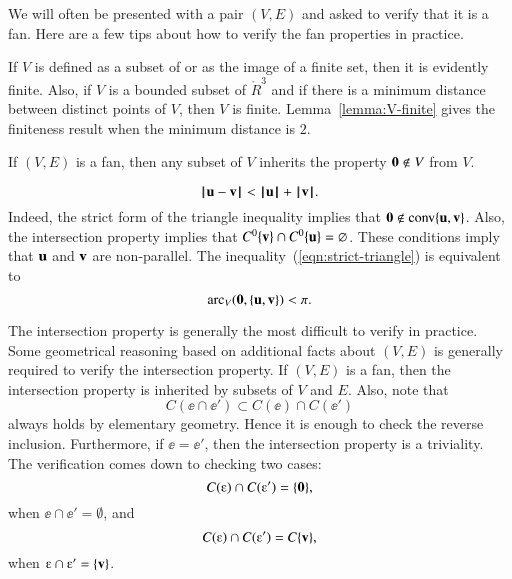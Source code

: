 \begin{remark}\label{remark:fan-verify}  
We will often be presented with a pair $(V,E)$ and asked to verify
that it is a fan.  Here are a few tips about how to verify the fan
properties in practice.
\begin{nomerate} 
\item {} If $V$ is defined as a subset of or as the image of a
finite set, then it is evidently finite.  Also, if $V$ is a bounded
subset of $\ring{R}^3$ and if there is a minimum distance between
distinct points of $V$, then $V$ is finite.
Lemma~\ref{lemma:V-finite} gives the finiteness result when the
minimum distance is $2$.\vspace{6pt}
\item {} If $(V,E)$ is a fan, then any subset of $V$
inherits the property ${\mathbf 0}\not\in V$ from $V$.  \vspace{6pt}
\item {} 
\begin{equation}\label{eqn:strict-triangle}
{\hskip0.1em|\hskip-0.15em|\hskip0.1em}{\mathbf u} - {\mathbf v}{\hskip0.1em|\hskip-0.15em|\hskip0.1em} < {{\hskip0.1em|\hskip-0.15em|\hskip0.1em}{\mathbf u}{\hskip0.1em|\hskip-0.15em|\hskip0.1em}} + {{\hskip0.1em|\hskip-0.15em|\hskip0.1em}{\mathbf v}{\hskip0.1em|\hskip-0.15em|\hskip0.1em}}.
\end{equation}
Indeed, the strict form of the triangle inequality implies that
${\mathbf 0}\not\in {\operatorname{conv}}\{{\mathbf u},{\mathbf v}\}$.  Also, the intersection property
implies that $C^0\{{\mathbf v}\} \cap C^0\{{\mathbf u}\} = \varnothing$.  These conditions
imply that ${\mathbf u}$ and ${\mathbf v}$ are non-parallel.  The inequality~(\ref{eqn:strict-triangle})
is equivalent to
\begin{displaymath}
\operatorname{arc}_V({\mathbf 0},\{{\mathbf u},{\mathbf v}\}) < \pi.
\end{displaymath}
\item {} The intersection property is generally the
most difficult to verify in practice.  Some geometrical reasoning
based on additional facts about $(V,E)$ is generally required to
verify the intersection property.  If $(V,E)$ is a fan, then the
intersection property is inherited by subsets of $V$ and $E$.  Also,
note that
\begin{displaymath}
C(\ee\cap \ee') \subset C(\ee) \cap C(\ee')
\end{displaymath}
always holds by elementary geometry.  Hence it is enough to check the
reverse inclusion.  Furthermore, if $\ee = \ee'$, then the
intersection property is a triviality.  The verification comes down to
checking two cases:
\begin{displaymath}
C(\ee) \cap C(\ee') = \{\orz\},
\end{displaymath}
when $\ee\cap \ee' = \emptyset$, and
\begin{displaymath}
C(\ee)\cap C(\ee') = C\{\v\},
\end{displaymath}
when $\ee\cap \ee' = \{\v\}$.
\end{nomerate}
\end{remark}


